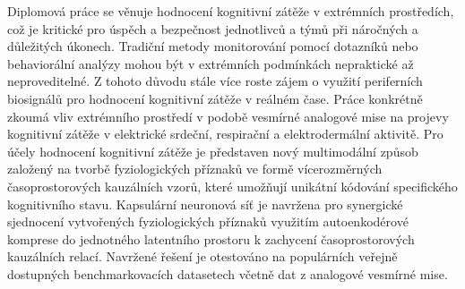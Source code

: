 Diplomová práce se věnuje hodnocení kognitivní zátěže v extrémních prostředích,
což je kritické pro úspěch a bezpečnost jednotlivců a týmů při náročných a
důležitých úkonech. Tradiční metody monitorování pomocí dotazníků nebo
behaviorální analýzy mohou být v extrémních podmínkách nepraktické až
neproveditelné. Z tohoto důvodu stále více roste zájem o využití periferních
biosignálů pro hodnocení kognitivní zátěže v reálném čase. Práce konkrétně
zkoumá vliv extrémního prostředí v podobě vesmírné analogové mise na projevy
kognitivní zátěže v elektrické srdeční, respirační a elektrodermální aktivitě.
Pro účely hodnocení kognitivní zátěže je představen nový multimodální způsob
založený na tvorbě fyziologických příznaků ve formě vícerozměrných
časoprostorových kauzálních vzorů, které umožňují unikátní kódování specifického
kognitivního stavu. Kapsulární neuronová síť je navržena pro synergické
sjednocení vytvořených fyziologických příznaků využitím autoenkodérové komprese
do jednotného latentního prostoru k zachycení časoprostorových kauzálních
relací. Navržené řešení je otestováno na populárních veřejně dostupných
benchmarkovacích datasetech včetně dat z analogové vesmírné mise.

